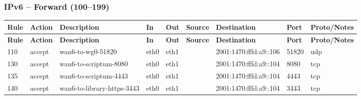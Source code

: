 \documentclass[a4paper,11pt]{article}
\begin{document}
\begin{landscape}
\subsubsection{IPv6 -- Forward (100--199)}
\begin{longtable}{|l|l|l|l|l|l|l|p{2.2cm}|l|}
\hline
\textbf{Rule} & \textbf{Action} & \textbf{Description} & \textbf{In} & \textbf{Out} & \textbf{Source} & \textbf{Destination} & \textbf{Port} & \textbf{Proto/Notes} \\
\hline
\endfirsthead
\hline
\textbf{Rule} & \textbf{Action} & \textbf{Description} & \textbf{In} & \textbf{Out} & \textbf{Source} & \textbf{Destination} & \textbf{Port} & \textbf{Proto/Notes} \\
\hline
\endhead
110 & accept & wan6-to-wg0-51820 & eth0 & eth1 & & 2001:1470:fffd:a9::106 & 51820 & udp \\
130 & accept & wan6-to-scriptum-8080 & eth0 & eth1 & & 2001:1470:fffd:a9::104 & 8080 & tcp \\
135 & accept & wan6-to-scriptum-4443 & eth0 & eth1 & & 2001:1470:fffd:a9::104 & 4443 & tcp \\
140 & accept & wan6-to-library-https-3443 & eth0 & eth1 & & 2001:1470:fffd:a9::104 & 3443 & tcp \\
\hline
\end{longtable}


\end{landscape}
\end{document}
